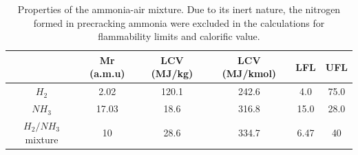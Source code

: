 \documentclass[11pt, oneside]{article}
\begin{document}
\begin{table} [h]
\begin{center}
\caption{Properties of the ammonia-air mixture. Due to its inert nature, the nitrogen formed in precracking ammonia were excluded in the calculations for flammability limits and calorific value. \cite{FL}} \label{tab:mixproperties}
\begin{tabular}{ |c|c|c|c|c|c| }
 \hline
& Mr (a.m.u) & LCV (MJ/kg) \cite{website:spg}& LCV (MJ/kmol) & LFL & UFL\\ 
 \hline
  $H_2$ & 2.02 & 120.1 & 242.6 & 4.0 & 75.0\\ 
 \hline
$NH_3$ & 17.03 & 18.6 & 316.8 & 15.0 & 28.0\\ 
 \hline
$H_2/NH_3$ mixture & 10 & 28.6 & 334.7 & 6.47 & 40\\
 \hline
\end{tabular}
\end{center} 
\end{table}



\end{document}
